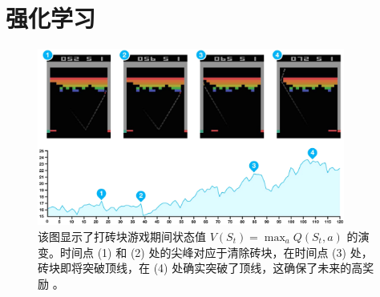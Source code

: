 \section{强化学习}\label{sec6.7}

\begin{figure}
    \centering
    \includegraphics[width=0.9\textwidth]{fig/fig6.5.png}
    \caption[DQN 状态值演化]{该图显示了打砖块游戏期间状态值 $V(S_t)=\max_aQ(S_t,a)$ 的演变。时间点 (1) 和 (2) 处的尖峰对应于清除砖块，在时间点 (3) 处，砖块即将突破顶线，在 (4) 处确实突破了顶线，这确保了未来的高奖励 \citep{nature14236}。}
    \label{fig6.5}
\end{figure}